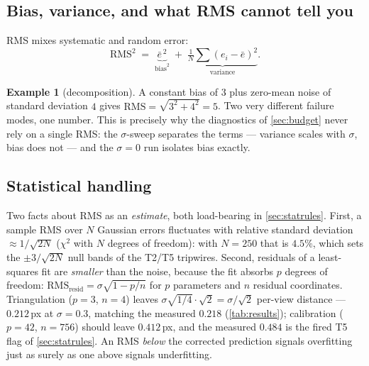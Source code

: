 \documentclass[11pt]{article}
\theoremstyle{definition}
\newtheorem{example}{Example}
\begin{document}
\subsection{Bias, variance, and what RMS cannot tell you}
RMS mixes systematic and random error:
\begin{equation}
\mathrm{RMS}^2 \;=\; \underbrace{\bar e^{\,2}}_{\text{bias}^2}
\;+\; \underbrace{\tfrac1N\sum (e_i-\bar e)^2}_{\text{variance}} .
\label{eq:biasvar}
\end{equation}

\begin{example}[decomposition]
\label{ex:rmsbias}
A constant bias of $3$ plus zero-mean noise of standard deviation $4$
gives $\mathrm{RMS}=\sqrt{3^2+4^2}=5$. Two very different failure modes,
one number. This is precisely why the diagnostics of \autoref{sec:budget}
never rely on a single RMS: the $\sigma$-sweep separates the terms ---
variance scales with $\sigma$, bias does not --- and the $\sigma=0$ run
isolates bias exactly.
\end{example}

\subsection{Statistical handling}
Two facts about RMS as an \emph{estimate}, both load-bearing in
\autoref{sec:statrules}. First, a sample RMS over $N$ Gaussian errors
fluctuates with relative standard deviation $\approx1/\sqrt{2N}$
($\chi^2$ with $N$ degrees of freedom): with $N=250$ that is $4.5\%$,
which sets the $\pm3/\sqrt{2N}$ null bands of the T2/T5 tripwires.
Second, residuals of a least-squares fit are \emph{smaller} than the
noise, because the fit absorbs $p$ degrees of freedom:
$\mathrm{RMS}_{\text{resid}}=\sigma\sqrt{1-p/n}$ for $p$ parameters and
$n$ residual coordinates. Triangulation ($p=3$, $n=4$) leaves
$\sigma\sqrt{1/4}\cdot\sqrt2=\sigma/\sqrt2$ per-view distance ---
$0.212$\,px at $\sigma=0.3$, matching the measured $0.218$
(\autoref{tab:results}); calibration ($p=42$, $n=756$) should leave
$0.412$\,px, and the measured $0.484$ is the fired T5 flag of
\autoref{sec:statrules}. An RMS \emph{below} the corrected prediction
signals overfitting just as surely as one above signals underfitting.
\end{document}
